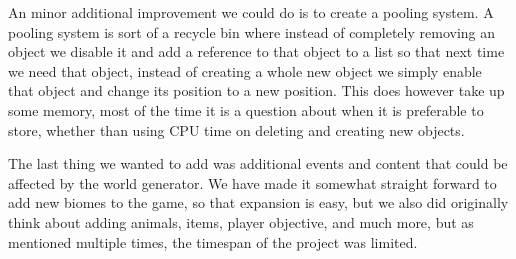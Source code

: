 An minor additional improvement we could do is to create a pooling system. A pooling system is sort of a recycle bin where instead of completely removing an object we disable it and add a reference to that object to a list so that next time we need that object, instead of creating a whole new object we simply enable that object and change its position to a new position. This does however take up some memory, most of the time it is a question about when it is preferable to store, whether than using CPU time on deleting and creating new objects.

The last thing we wanted to add was additional events and content that could be affected by the world generator. We have made it somewhat straight forward to add new biomes to the game, so that expansion is easy, but we also did originally think about adding animals, items, player objective, and much more, but as mentioned multiple times, the timespan of the project was limited.